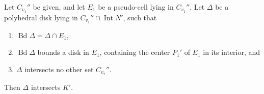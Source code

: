Let $C_{v_1}''$ be given, and let $E_1$ be a pseudo-cell lying in $C_{v_1}''$. Let $\Delta$ be a polyhedral disk lying in $C_{v_1}'' \cap \operatorname{Int} N'$, such that
\begin{enumerate}
\item[(1)] $\operatorname{Bd} \Delta = \Delta \cap E_1$,
\item[(2)] $\operatorname{Bd} \Delta$ bounds a disk in $E_1$, containing the center $P_1'$ of $E_1$ in its interior, and
\item[(3)] $\Delta$ intersects no other set $C_{v_2}''$.
\end{enumerate}
Then $\Delta$ intersects $K'$.
